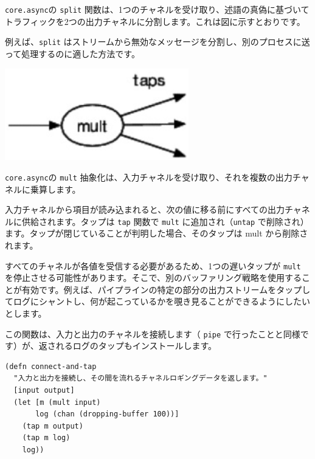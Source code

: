 \texttt{core.async}の \texttt{split} 関数は、1つのチャネルを受け取り、述語の真偽に基づいてトラフィックを2つの出力チャネルに分割します。これは図に示すとおりです。

例えば、\texttt{split} はストリームから無効なメッセージを分割し、別のプロセスに送って処理するのに適した方法です。


\includegraphics[width=8cm]{fig_06_004.eps}

\texttt{core.async}の \texttt{mult} 抽象化は、入力チャネルを受け取り、それを複数の出力チャネルに乗算します。

入力チャネルから項目が読み込まれると、次の値に移る前にすべての出力チャネルに供給されます。タップは \texttt{tap} 関数で \texttt{mult} に追加され（\texttt{untap} で削除され）ます。タップが閉じていることが判明した場合、そのタップは mult から削除されます。

すべてのチャネルが各値を受信する必要があるため、1つの遅いタップが \texttt{mult} を停止させる可能性があります。そこで、別のバッファリング戦略を使用することが有効です。例えば、パイプラインの特定の部分の出力ストリームをタップしてログにシャントし、何が起こっているかを覗き見ることができるようにしたいとします。

この関数は、入力と出力のチャネルを接続します（ \texttt{pipe} で行ったことと同様です）が、返されるログのタップもインストールします。


\begin{lstlisting}[numbers=none]
(defn connect-and-tap
  "入力と出力を接続し、その間を流れるチャネルロギングデータを返します。"
  [input output]
  (let [m (mult input)
       log (chan (dropping-buffer 100))]
    (tap m output)
    (tap m log)
    log))
\end{lstlisting}

